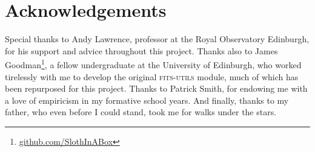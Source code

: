 \documentclass[a4paper,11pt]{article}
\begin{document}
\section*{Acknowledgements}

Special thanks to Andy Lawrence, professor at the Royal Observatory Edinburgh, for his support and advice throughout this project. Thanks also to James Goodman\footnote{\url{github.com/SlothInABox}}, a fellow undergraduate at the University of Edinburgh, who worked tirelessly with me to develop the original \textsc{fits-utils} module, much of which has been repurposed for this project. Thanks to Patrick Smith, for endowing me with a love of empiricism in my formative school years. And finally, thanks to my father, who even before I could stand, took me for walks under the stars.

\printbibliography
\end{document}
